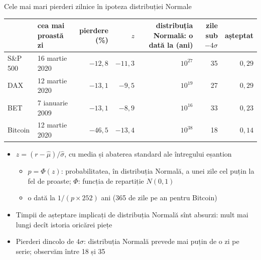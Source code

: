 \begin{frame}{Cele mai mari pierderi zilnice în ipoteza distribuției Normale}
\itemsize{\footnotesize}
\begin{center}
\scriptsize
\begin{tabular}{llrrrrr}
\toprule
& cea mai proastă zi & pierdere (\%) & $z$ & distribuția Normală: o dată la (ani) & zile sub $-4\sigma$ & așteptat \\
\midrule
S\&P 500 & 16 martie 2020 & ${-12{,}8}$ & ${-11{,}3}$ & $10^{27}$ & 35 & $0{,}29$ \\
DAX & 12 martie 2020 & ${-13{,}1}$ & ${-9{,}5}$ & $10^{19}$ & 27 & $0{,}29$ \\
BET & 7 ianuarie 2009 & ${-13{,}1}$ & ${-8{,}9}$ & $10^{16}$ & 33 & $0{,}23$ \\
Bitcoin & 12 martie 2020 & ${-46{,}5}$ & ${-13{,}4}$ & $10^{38}$ & 18 & $0{,}14$ \\
\bottomrule
\end{tabular}
\end{center}
\begin{itemize}
    \item $z = (r - \hat\mu)/\hat\sigma$, cu media și abaterea standard ale întregului eșantion
    \begin{itemize}
        \item $p = \Phi(z)$: probabilitatea, în distribuția Normală, a unei zile cel puțin la fel de proaste; $\Phi$: funcția de repartiție $N(0, 1)$
        \item o dată la $1/(p \times 252)$ ani (365 de zile pe an pentru Bitcoin)
    \end{itemize}
    \item Timpii de așteptare implicați de distribuția Normală sînt absurzi: mult mai lungi decît istoria oricărei piețe
    \item Pierderi dincolo de $4\sigma$: distribuția Normală prevede mai puțin de o zi pe serie; observăm între 18 și 35
\end{itemize}
\end{frame}

